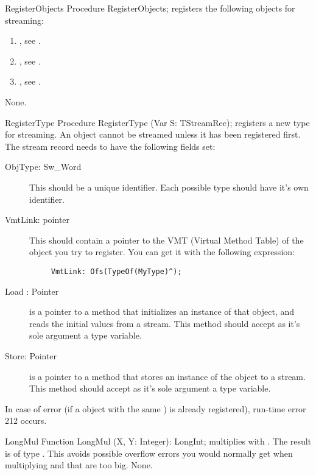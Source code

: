 \begin{procedure}{RegisterObjects}
\Declaration
Procedure RegisterObjects;
\Description
{} registers the following objects for streaming:
\begin{enumerate}
\item {}, see .
\item {}, see .
\item {}, see .
\end{enumerate}
\Errors
None.
\SeeAlso
{}
\end{procedure}

\begin{procedure}{RegisterType}
\Declaration
Procedure RegisterType (Var S: TStreamRec);
\Description
{} registers a new type for streaming. An object cannot
be streamed unless it has been registered first. 
The stream record  needs to have the following fields set:

\begin{description}
\item[ObjType: Sw\_Word] This should be a unique identifier. Each possible
type should have it's own identifier. 
\item[VmtLink: pointer] This should contain a pointer to the VMT (Virtual
Method Table) of the object you try to register. You can get it with the
following expression:
\begin{verbatim}
     VmtLink: Ofs(TypeOf(MyType)^);
\end{verbatim}
\item[Load : Pointer] is a pointer to a method that initializes an instance
of that object, and reads the initial values from a stream. This method
should accept as it's sole argument a  type variable.
\item[Store: Pointer]is a pointer to a method that stores an instance of the
object to a stream. This method should accept as it's sole argument
 a  type variable.
\end{description}
\Errors
In case of error (if a object with the same ) is already
registered), run-time error 212 occurs.
\end{procedure}


\begin{function}{LongMul}
\Declaration
Function LongMul (X, Y: Integer): LongInt;
\Description
{} multiplies  with . The result is of
type . This avoids possible overflow errors you would normally
get when multiplying  and  that are too big.
\Errors
None.
\SeeAlso
{}
\end{function}

